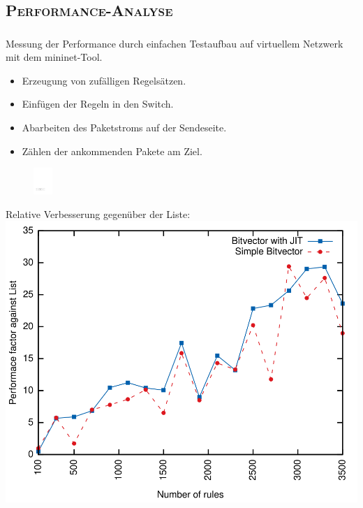 \documentclass[xcolor=x11names,compress]{beamer}
\renewcommand{\(}{\begin{columns}}
\renewcommand{\)}{\end{columns}}
\newcommand{\<}[1]{\begin{column}{#1}}
\renewcommand{\>}{\end{column}}
\begin{document}
\subsection{\scshape Performance-Analyse}
\begin{frame}
  \frametitle{\insertsubsection}
  Messung der Performance durch einfachen Testaufbau auf virtuellem Netzwerk mit dem \textsf{mininet}-Tool.
  \begin{itemize}
    \item Erzeugung von zufälligen Regelsätzen.
    \item Einfügen der Regeln in den Switch.
    \item Abarbeiten des Paketstroms auf der Sendeseite.
    \item Zählen der ankommenden Pakete am Ziel.
  \end{itemize}
  \begin{figure}
  \centering
  \includegraphics[height=1cm]{figures/ofswitch-perftest}
  \end{figure}
\end{frame}

\begin{frame}
  Relative Verbesserung gegenüber der Liste:
  \includegraphics[height=0.9\textheight]{figures/eval_w_relative}
\end{frame}
\end{document}
